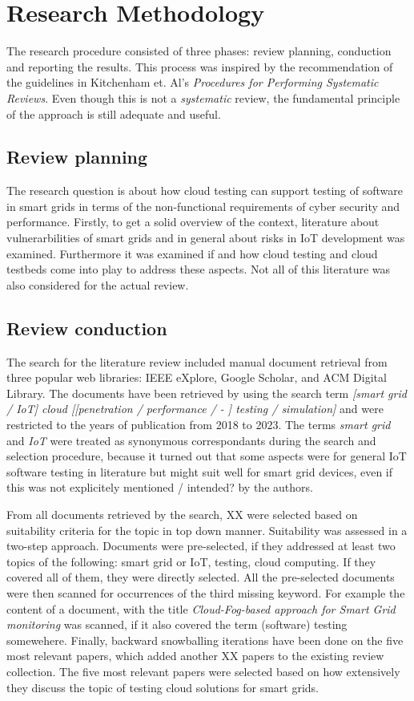 \section{Research Methodology}
The research procedure consisted of three phases: review planning, conduction and reporting the results. This process was inspired by the recommendation of the guidelines in Kitchenham et. Al's \textit{Procedures for Performing Systematic Reviews}\cite{kitchenham2004procedures}. Even though this is not a \textit{systematic} review, the fundamental principle of the approach is still adequate and useful.

\subsection{Review planning}
The research question is about how cloud testing can support testing of software in smart grids in terms of the non-functional requirements of cyber security and performance. Firstly, to get a solid overview of the context, literature about vulnerarbilities of smart grids and in general about risks in IoT development was examined. Furthermore it was examined if and how cloud testing and cloud testbeds come into play to address these aspects. Not all of this literature was also considered for the actual review.

\subsection{Review conduction}

The search for the literature review included manual document retrieval from three popular web libraries: IEEE eXplore, Google Scholar, and ACM Digital Library. The documents have been retrieved by using the search term \textit{[smart grid / IoT] cloud [[penetration / performance / - ] testing / simulation]} and were restricted to the years of publication from 2018 to 2023. The terms \textit{smart grid} and \textit{IoT} were treated as synonymous correspondants during the search and selection procedure, because it turned out that some aspects were for general IoT software testing in literature but might suit well for smart grid devices, even if this was not explicitely mentioned / intended? by the authors.

From all documents retrieved by the search, XX were selected based on suitability criteria for the topic in top down manner. Suitability was assessed in a two-step approach. Documents were pre-selected, if they addressed at least two topics of the following: smart grid or IoT, testing, cloud computing. If they covered all of them, they were directly selected. All the pre-selected documents were then scanned for occurrences of the third missing keyword. For example the content of a document, with the title \textit{Cloud-Fog-based approach for Smart Grid monitoring} was scanned, if it also covered the term (software) testing somewehere. Finally, backward snowballing iterations have been done on the five most relevant papers, which added another XX papers to the existing review collection. The five most relevant papers were selected based on how extensively they discuss the topic of testing cloud solutions for smart grids.

